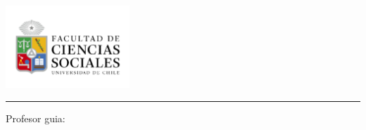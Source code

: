 \makeatletter
\providecommand{\subtitle}[1]{\gdef\@subtitle{#1}}
\providecommand{\@subtitle}{}
\providecommand{\frontmattercontext}{}
\providecommand{\advisorname}{}
\providecommand{\advisorlabel}{Profesor guia:}
\providecommand{\frontmatterlocation}{}

\newcommand{\PrintTitle}{%
  {\sffamily\bfseries\fontsize{24pt}{28pt}\selectfont \@title\par}%
}
\newcommand{\PrintSubtitle}{%
  \begingroup
  \edef\temp{\detokenize{\@subtitle}}%
  \ifx\temp\empty\relax
  \else
    {\sffamily\bfseries\large \@subtitle\par}%
  \fi
  \endgroup
}
\newcommand{\PrintAuthor}{%
  {\Large\bfseries \@author\par}%
}
\newcommand{\PrintDate}{%
  {\small \@date\par}%
}
\makeatother

\begin{titlepage}
\thispagestyle{empty}
\begin{center}
\vspace*{10mm}

\includegraphics[width=0.35\textwidth]{assets/cover.png}\par
\vspace{12mm}

\PrintTitle
\vspace{6mm}
\PrintSubtitle

\vspace{22mm}
\begingroup
\edef\temp{\detokenize{\frontmattercontext}}%
\ifx\temp\empty\relax
\else
  {\normalsize \frontmattercontext\par}
\fi
\endgroup

\vspace{18mm}
\PrintAuthor

\vspace{16mm}
\begingroup
\edef\temp{\detokenize{\advisorname}}%
\ifx\temp\empty\relax
\else
  \rule{0.45\textwidth}{0.4pt}\par
  {\small \advisorlabel\ \advisorname\par}
\fi
\endgroup

\vfill
\begingroup
\edef\temp{\detokenize{\frontmatterlocation}}%
\ifx\temp\empty\relax
\else
  {\small \frontmatterlocation\par}
\fi
\endgroup
\PrintDate

\end{center}
\end{titlepage}

\frontmatter
\pagestyle{scrheadings}

\setcounter{tocdepth}{2} %
\tableofcontents
\cleardoublepage
\listoffigures
\cleardoublepage
\listoftables
\cleardoublepage
